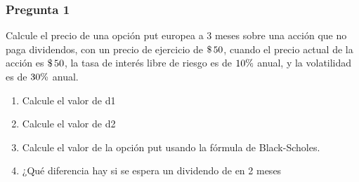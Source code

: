\documentclass{beamer}
\begin{document}
\pgfmathsetmacro{\acuatro}{(\rdiez+ \ados)*\Tuno}
\pgfmathsetmacro{\acinco}{\auno+\acuatro }
\pgfmathsetmacro{\aseis}{\acinco /\atres }
\pgfmathsetmacro{\asiete}{\aseis - \atres}

\newcommand{\deuno}{\decimalx{\aseis}}
\newcommand{\dedos}{\decimalx{\asiete}}

\pgfmathsetmacro{\anueve}{\Kuno*\aocho*\phimenosddos}
\pgfmathsetmacro{\adiez}{\Suno*\phimenosduno}
\pgfmathsetmacro{\aonce}{\anueve - \adiez}

\pgfmathsetmacro{\acatorce}{\Suno-\atrece}
\newcommand{\Sdos}{\decimalx{\acatorce}}
\pgfmathsetmacro{\adieciseis}{\aquince+\acinco}
\pgfmathsetmacro{\adiecisiete}{\adieciseis/\atres}
\pgfmathsetmacro{\adieciocho}{\adiecisiete-\atres}
\pgfmathsetmacro{\adiecinueve}{-\adieciocho}

\pgfmathsetmacro{\aveinte}{\Kuno*\aocho*\phiddosnuevo}
\pgfmathsetmacro{\aveintiuno}{\acatorce*\phidunonuevo}
\pgfmathsetmacro{\aveintidos}{\aveinte-\aveintiuno}




\newcommand{\Preguno}{Calcule el precio de una opción put europea a 3 meses sobre una acción que no paga dividendos, 
con un precio de ejercicio de $\dinero{\Kuno}$, cuando el precio actual de la acción es $\dinero{\Suno}$, la tasa 
de interés libre de riesgo es de $\porcentaje{\rdiez}$ anual, y la volatilidad es de $\porcentaje{\sigmaPuno}$ anual.
}
\newcommand{\Pregunoa}{Calcule el valor de d1}
\newcommand{\Pregunob}{Calcule el valor de d2}
\newcommand{\Pregunoc}{Calcule el valor de la opción put usando la fórmula de Black-Scholes.}
\newcommand{\Pregunod}{¿Qué diferencia hay si se espera un dividendo de \dinero{\Divuno} en 2 meses}



\begin{frame}
  \frametitle{Pregunta 1}
  \justify
  \Preguno
  \vspace{1em}

\begin{enumerate}[label=\textbf{\alph*)}]
  \item \Pregunoa
  \item \Pregunob
  \item \Pregunoc
  \item \Pregunod
\end{enumerate}

\end{frame}
\end{document}

